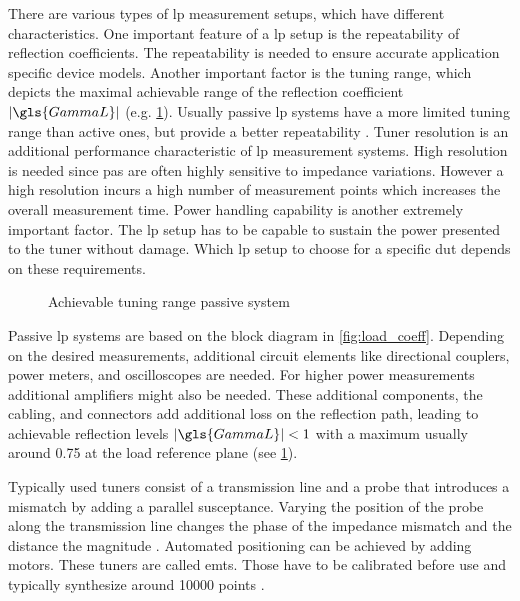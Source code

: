 \documentclass[12pt,a4paper,parskip=full,abstract=true,BCOR=12mm]{scrreprt}
\providecommand{\abs}[1]{\lvert#1\rvert}
\begin{document}
There are various types of \gls{lp} measurement setups, which have different
characteristics. One important feature of a \gls{lp} setup is the repeatability of reflection
coefficients. The repeatability is needed to ensure accurate application
specific device models. Another important factor is the tuning range, which
depicts the maximal achievable range of the reflection coefficient $\abs{\gls{GammaL}}$
(e.g. \cref{fig:range_passive}). Usually passive \gls{lp}
systems have a more limited tuning range than active ones, but provide a
better repeatability \cite{ghannouchi_load-pull_2013}. Tuner resolution is an additional performance characteristic
of \gls{lp} measurement systems. High resolution is needed since \glspl{pa} are often
highly sensitive to impedance variations. However a high resolution incurs a high number of measurement points
which increases the overall measurement time. Power handling capability is another extremely important factor. The \gls{lp}
setup has to be capable to sustain the power presented to the tuner without
damage. Which \gls{lp} setup to choose for a specific \gls{dut} depends on
these requirements.

\begin{figure}[htb]
    \centering
    \caption{Achievable tuning range passive  system}
    \label{fig:range_passive}
\end{figure}

Passive \gls{lp} systems are based on the block diagram in \cref{fig:load_coeff}. Depending on
the desired measurements, additional circuit elements like directional couplers,
power meters, and oscilloscopes are needed. For higher power measurements additional
amplifiers might also be needed. These additional components, the cabling, and connectors add additional loss
on the reflection path, leading to achievable reflection levels $\abs{\gls{GammaL}} < 1$ with
a maximum usually around \num{0.75} at the load reference plane \cite{de_groote_introduction_2008} (see \cref{fig:range_passive}).

Typically used tuners consist of a transmission line and a probe that introduces a mismatch
by adding a parallel susceptance. Varying the position of the probe along the transmission
line changes the phase of the impedance mismatch and the distance the magnitude \cite{hashmi_highly_2011}.
Automated positioning can be achieved by adding motors. These tuners are called \glspl{emt}.
Those have to be calibrated before use and typically synthesize around \num{10000} points \cite{ghannouchi_load-pull_2013}.
\end{document}
